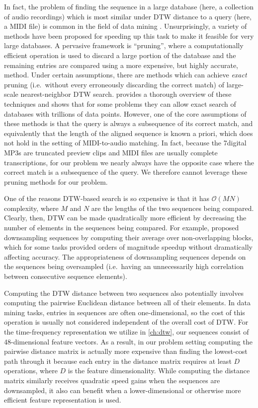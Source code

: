 In fact, the problem of finding the sequence in a large database (here, a collection of audio recordings) which is most similar under DTW distance to a query (here, a MIDI file) is common in the field of data mining \cite{berndt1994using}.
Unsurprisingly, a variety of methods have been proposed for speeding up this task to make it feasible for very large databases.
A pervasive framework is ``pruning'', where a computationally efficient operation is used to discard a large portion of the database and the remaining entries are compared using a more expensive, but highly accurate, method.
Under certain assumptions, there are methods which can achieve {\em exact} pruning (i.e.\ without every erroneously discarding the correct match) of large-scale nearest-neighbor DTW search.
\cite{rakthanmanon2012searching} provides a thorough overview of these techniques and shows that for some problems they can allow exact search of databases with trillions of data points.
However, one of the core assumptions of these methods is that the query is always a subsequence of its correct match, and equivalently that the length of the aligned sequence is known a priori, which does not hold in the setting of MIDI-to-audio matching.
In fact, because the 7digital MP3s are truncated preview clips and MIDI files are usually complete transcriptions, for our problem we nearly always have the opposite case where the correct match is a subsequence of the query.
We therefore cannot leverage these pruning methods for our problem.

One of the reasons DTW-based search is so expensive is that it has $\mathcal{O}(MN)$ complexity, where $M$ and $N$ are the lengths of the two sequences being compared.
Clearly, then, DTW can be made quadratically more efficient by decreasing the number of elements in the sequences being compared.
For example, \cite{keogh2001dimensionality,yi2000fast} proposed downsampling sequences by computing their average over non-overlapping blocks, which for some tasks provided orders of magnitude speedup without dramatically affecting accuracy.
The appropriateness of downsampling sequences depends on the sequences being oversampled (i.e.\ having an unnecessarily high correlation between consecutive sequence elements).

Computing the DTW distance between two sequences also potentially involves computing the pairwise Euclidean distance between all of their elements.
In data mining tasks, entries in sequences are often one-dimensional, so the cost of this operation is usually not considered independent of the overall cost of DTW.
For the time-frequency representation we utilize in \cref{ch:dtw}, our sequences consist of 48-dimensional feature vectors.
As a result, in our problem setting computing the pairwise distance matrix is actually more expensive than finding the lowest-cost path through it because each entry in the distance matrix requires at least $D$ operations, where $D$ is the feature dimensionality.
While computing the distance matrix similarly receives quadratic speed gains when the sequences are downsampled, it also can benefit when a lower-dimensional or otherwise more efficient feature representation is used.

